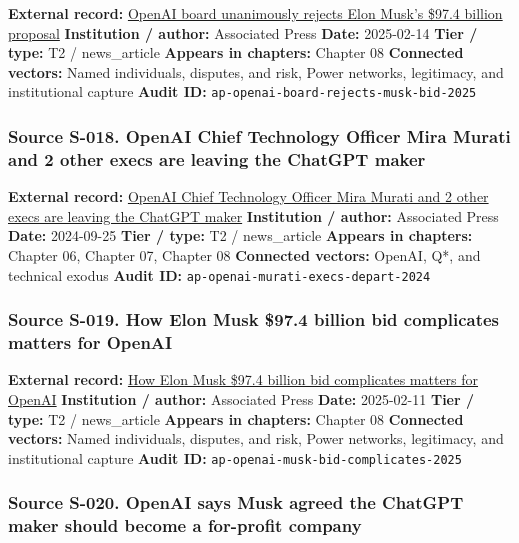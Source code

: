 \documentclass[
  american,
  11pt,
  letterpaper,
]{article}
\begin{document}
\textbf{External record:}
\href{https://apnews.com/article/f6831a82a92352ab7571a9fde46038d1}{OpenAI
board unanimously rejects Elon Musk's \$97.4 billion proposal}
\textbf{Institution / author:} Associated Press \textbf{Date:}
2025-02-14 \textbf{Tier / type:} T2 / news\_article \textbf{Appears in
chapters:} Chapter 08 \textbf{Connected vectors:} Named individuals,
disputes, and risk, Power networks, legitimacy, and institutional
capture \textbf{Audit ID:}
\texttt{ap-openai-board-rejects-musk-bid-2025}

\subsubsection{Source S-018. OpenAI Chief Technology Officer Mira Murati
and 2 other execs are leaving the ChatGPT
maker}\label{source-s-018-openai-chief-technology-officer-mira-murati-and-2-other-execs-are-leaving-the-chatgpt-maker}

\textbf{External record:}
\href{https://apnews.com/article/df75217584696b442935dbccc9b0347d}{OpenAI
Chief Technology Officer Mira Murati and 2 other execs are leaving the
ChatGPT maker} \textbf{Institution / author:} Associated Press
\textbf{Date:} 2024-09-25 \textbf{Tier / type:} T2 / news\_article
\textbf{Appears in chapters:} Chapter 06, Chapter 07, Chapter 08
\textbf{Connected vectors:} OpenAI, Q*, and technical exodus
\textbf{Audit ID:} \texttt{ap-openai-murati-execs-depart-2024}

\subsubsection{Source S-019. How Elon Musk \$97.4 billion bid
complicates matters for
OpenAI}\label{source-s-019-how-elon-musk-97-4-billion-bid-complicates-matters-for-openai}

\textbf{External record:}
\href{https://apnews.com/article/58d9bc3d59497468d7b37ecd5d9ff5e6}{How
Elon Musk \$97.4 billion bid complicates matters for OpenAI}
\textbf{Institution / author:} Associated Press \textbf{Date:}
2025-02-11 \textbf{Tier / type:} T2 / news\_article \textbf{Appears in
chapters:} Chapter 08 \textbf{Connected vectors:} Named individuals,
disputes, and risk, Power networks, legitimacy, and institutional
capture \textbf{Audit ID:} \texttt{ap-openai-musk-bid-complicates-2025}

\subsubsection{Source S-020. OpenAI says Musk agreed the ChatGPT maker
should become a for-profit
company}\label{source-s-020-openai-says-musk-agreed-the-chatgpt-maker-should-become-a-for-profit-company}
\end{document}
